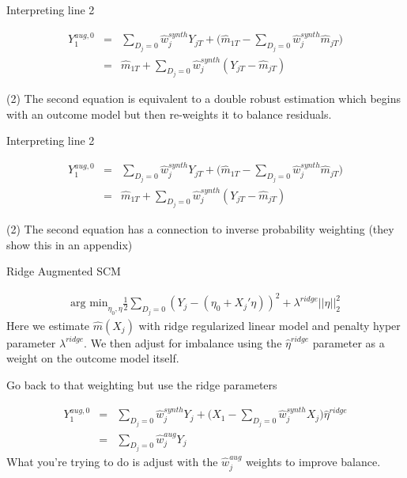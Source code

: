 \documentclass{beamer}
\begin{document}
\begin{frame}{Interpreting line 2}

\begin{eqnarray*}
Y_1^{aug,0}  &=& \sum_{D_j=0} \widehat{w}_j^{synth} Y_{jT} + \bigg (\widehat{m}_{1T} - \sum_{D_j=0} \widehat{w}_j^{synth}\widehat{m}_{jT} \bigg ) \\
&=& \widehat{m}_{1T} + \sum_{D_j=0} \widehat{w}_j^{synth} (Y_{jT} - \widehat{m}_{jT})
\end{eqnarray*}

(2) The second equation is equivalent to a double robust estimation which begins with an outcome model but then re-weights it to balance residuals.


\end{frame}



\begin{frame}{Interpreting line 2}

\begin{eqnarray*}
Y_1^{aug,0}  &=& \sum_{D_j=0} \widehat{w}_j^{synth} Y_{jT} + \bigg (\widehat{m}_{1T} - \sum_{D_j=0} \widehat{w}_j^{synth}\widehat{m}_{jT} \bigg ) \\
&=& \widehat{m}_{1T} + \sum_{D_j=0} \widehat{w}_j^{synth} (Y_{jT} - \widehat{m}_{jT})
\end{eqnarray*}

(2) The second equation has a connection to inverse probability weighting (they show this in an appendix)


\end{frame}
\begin{frame}{Ridge Augmented SCM}

\begin{eqnarray*}
\textrm{arg min}_{\eta_0,\eta} \frac{1}{2} \sum_{D_j=0} (Y_j - (\eta_0 + X_j'\eta))^2 + \lambda^{ridge} || \eta ||_2^2
\end{eqnarray*}Here we estimate $\widehat{m}(X_j)$ with ridge regularized linear model and penalty hyper parameter $\lambda^{ridge}$. We then adjust for imbalance using the $\widehat{\eta}^{ridge}$ parameter as a weight on the outcome model itself. 

\end{frame}





\begin{frame}{Go back to that weighting but use the ridge parameters}

\begin{eqnarray*}
Y_1^{aug,0} &=& \sum_{D_j=0} \widehat{w}_j^{synth} Y_{j} + \bigg ( X_1 - \sum_{D_j=0} \widehat{w}_j^{synth} X_j \bigg ) \widehat{\eta}^{ridge} \\
&=& \sum_{D_j=0} \widehat{w}_j^{aug}Y_j
\end{eqnarray*}What you're trying to do is adjust with the $\widehat{w}_j^{aug}$ weights to improve balance.  

\end{frame}
\end{document}
